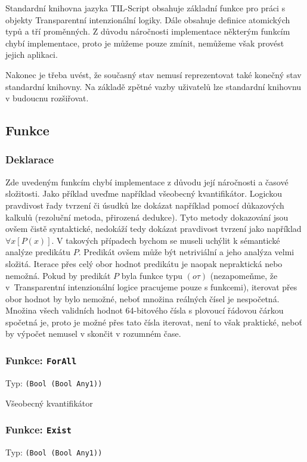 Standardní knihovna jazyka TIL-Script obsahuje základní funkce pro práci s objekty Transparentní
intenzionální logiky. Dále obsahuje definice atomických typů a tří proměnných. Z důvodu náročnosti
implementace některým funkcím chybí implementace, proto je můžeme pouze zmínit, nemůžeme však
provést jejich aplikaci.

Nakonec je třeba uvést, že současný stav nemusí reprezentovat také konečný stav standardní knihovny.
Na základě zpětné vazby uživatelů lze standardní knihovnu v budoucnu rozšiřovat.

\subsection{Funkce}

\subsubsection{Deklarace}

Zde uvedeným funkcím chybí implementace z důvodu její náročnosti a časové složitosti. Jako příklad
uveďme například všeobecný kvantifikátor. Logickou pravdivost řady tvrzení či úsudků lze dokázat
například pomocí důkazových kalkulů (rezoluční metoda, přirozená dedukce). Tyto metody dokazování
jsou ovšem čistě syntaktické, nedokáží tedy dokázat pravdivost tvrzení jako například $\forall x[P(x)]$.
V takových případech bychom se museli uchýlit k sémantické analýze predikátu $P$.
Predikát ovšem může být netriviální a jeho analýza velmi složitá. Iterace přes celý obor hodnot
predikátu je naopak nepraktická nebo nemožná. Pokud by predikát $P$ byla funkce typu $(o\tau)$
(nezapomeňme, že v~Transparentní intenzionální logice pracujeme pouze s funkcemi), iterovat přes
obor hodnot by bylo nemožné, neboť množina reálných čísel je nespočetná. Množina všech validních
hodnot 64-bitového čísla s plovoucí řádovou čárkou spočetná je, proto je možné přes tato čísla
iterovat, není to však praktické, neboť by výpočet nemusel v skončit v rozumném čase.

\subsubsection*{Funkce: \lstinline|ForAll|}
Typ: \lstinline|(Bool (Bool Any1))|

Všeobecný kvantifikátor

\subsubsection*{Funkce: \lstinline|Exist|}
Typ: \lstinline|(Bool (Bool Any1))|

